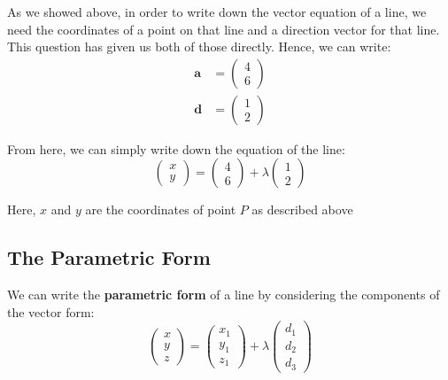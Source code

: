 \documentclass[
	11pt, %
	fleqn, %
	a4paper, %
]{../../styles/LegrandOrangeBook}
\begin{document}
\begin{solution}
As we showed above, in order to write down the vector equation of a line, we need the coordinates of a point on that line and a direction vector for that line. This question has given us both of those directly. Hence, we can write:
	\begin{align*}
		\mathbf{a} &= \begin{pmatrix}
			4 \\ 
			6
		\end{pmatrix} \\
		\mathbf{d} &= \begin{pmatrix}
			1 \\ 
			2
		\end{pmatrix}
	\end{align*}
	
	From here, we can simply write down the equation of the line:
	\begin{equation*}
		\begin{pmatrix}
        	x \\
        	y
    	\end{pmatrix} = \begin{pmatrix}
			4 \\ 
			6
		\end{pmatrix} + \lambda \begin{pmatrix}
			1 \\ 
			2
		\end{pmatrix}
	\end{equation*}
	
	Here, $x$ and $y$ are the coordinates of point $P$ as described above
\end{solution}


\subsection{The Parametric Form}

We can write the \textbf{parametric form} of a line by considering the components of the vector form:
\begin{equation*}
    \begin{pmatrix}
        x \\
        y \\
        z
    \end{pmatrix} = \begin{pmatrix}
        x_1 \\
        y_1 \\
        z_1
    \end{pmatrix} + \lambda \begin{pmatrix}
        d_1 \\
        d_2 \\
        d_3
    \end{pmatrix}
\end{equation*}
\end{document}
